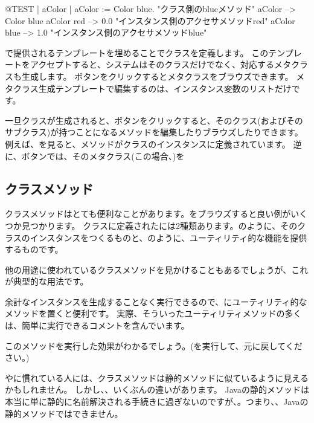 \documentclass[a4paper,10pt,twoside]{book}
\begin{document}
\begin{code}{@TEST | aColor |}
aColor := Color blue.               "クラス側のblueメソッド"
aColor        --> Color blue
aColor red  --> 0.0         "インスタンス側のアクセサメソッドred"
aColor blue --> 1.0        "インスタンス側のアクセサメソッドblue"
\end{code}

で提供されるテンプレートを埋めることでクラスを定義します。
このテンプレートをアクセプトすると、システムはそのクラスだけでなく、対応するメタクラスも生成します。
ボタンをクリックするとメタクラスをブラウズできます。
メタクラス生成テンプレートで編集するのは、インスタンス変数のリストだけです。

一旦クラスが生成されると、ボタンをクリックすると、そのクラス(およびそのサブクラス)が持つことになるメソッドを編集したりブラウズしたりできます。例えば、を見ると、メソッドがクラスのインスタンスに定義されています。
逆に、ボタンでは、そのメタクラス(この場合、)を

\subsection{クラスメソッド} 

クラスメソッドはとても便利なことがあります。をブラウズすると良い例がいくつか見つかります。
クラスに定義されたには2種類あります。のように、そのクラスのインスタンスをつくるものと、のように、ユーティリティ的な機能を提供するものです。

他の用途に使われているクラスメソッドを見かけることもあるでしょうが、これが典型的な用法です。

余計なインスタンスを生成することなく実行できるので、にユーティリティ的なメソッドを置くと便利です。
実際、そういったユーティリティメソッドの多くは、簡単に実行できるコメントを含んでいます。

このメソッドを実行した効果がわかるでしょう。(を実行して、元に戻してください。)

やに慣れている人には、クラスメソッドは静的メソッドに似ているように見えるかもしれません。
しかし、、いくぶんの違いがあります。
Javaの静的メソッドは本当に単に静的に名前解決される手続きに過ぎないのですが、。つまり、、Javaの静的メソッドではできません。
\end{document}
